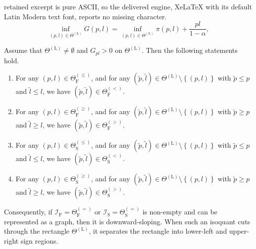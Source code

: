 \documentclass[10pt,a4paper]{amsart}
\begin{document}
retained excerpt is pure ASCII, so the delivered engine, XeLaTeX with its default Latin Modern text font, reports no missing character.
\begin{equation}
\inf_{\left(p,l\right)\in\Theta^{\left(\text{L}\right)}}G\left(p,l\right)=\inf_{\left(p,l\right)\in\Theta^{\left(\text{L}\right)}}\pi\left(p,l\right)+\frac{pl}{1-\alpha},
\label{eq:TVaR_problem<=}
\end{equation}

\begin{lemma}\label{eq:gradient_property}
Assume that $\Theta^{\left(\text{L}\right)}\neq\emptyset$ and $G_{pl}>0$ on $\Theta^{\left(\text{L}\right)}$. Then the following statements hold.
\begin{enumerate}
\item[(i)] For any $\left(p,l\right)\in\Theta_{\text{F}}^{\left(\leq\right)}$, and for any $\left(\tilde{p},\tilde{l}\right)\in\Theta^{\left(\text{L}\right)}\setminus\left\{\left(p,l\right)\right\}$ with $\tilde{p}\leq p$ and $\tilde{l}\leq l$, we have $\left(\tilde{p},\tilde{l}\right)\in\Theta_{\text{F}}^{\left(<\right)}$.
\item[(ii)] For any $\left(p,l\right)\in\Theta_{\text{F}}^{\left(\geq\right)}$, and for any $\left(\tilde{p},\tilde{l}\right)\in\Theta^{\left(\text{L}\right)}\setminus\left\{\left(p,l\right)\right\}$ with $\tilde{p}\geq p$ and $\tilde{l}\geq l$, we have $\left(\tilde{p},\tilde{l}\right)\in\Theta_{\text{F}}^{\left(>\right)}$.
\item[(iii)] For any $\left(p,l\right)\in\Theta_{\text{S}}^{\left(\leq\right)}$, and for any $\left(\tilde{p},\tilde{l}\right)\in\Theta^{\left(\text{L}\right)}\setminus\left\{\left(p,l\right)\right\}$ with $\tilde{p}\leq p$ and $\tilde{l}\leq l$, we have $\left(\tilde{p},\tilde{l}\right)\in\Theta_{\text{S}}^{\left(<\right)}$.
\item[(iv)] For any $\left(p,l\right)\in\Theta_{\text{S}}^{\left(\geq\right)}$, and for any $\left(\tilde{p},\tilde{l}\right)\in\Theta^{\left(\text{L}\right)}\setminus\left\{\left(p,l\right)\right\}$ with $\tilde{p}\geq p$ and $\tilde{l}\geq l$, we have $\left(\tilde{p},\tilde{l}\right)\in\Theta_{\text{S}}^{\left(>\right)}$.
\end{enumerate}
Consequently, if $\mathcal{I}_{\text{F}}=\Theta_{\text{F}}^{\left(=\right)}$ or $\mathcal{I}_{\text{S}}=\Theta_{\text{S}}^{\left(=\right)}$ is non-empty and can be represented as a graph, then it is downward-sloping. When such an isoquant cuts through the rectangle $\Theta^{\left(\text{L}\right)}$, it separates the rectangle into lower-left and upper-right sign regions.
\end{lemma}
\end{document}
